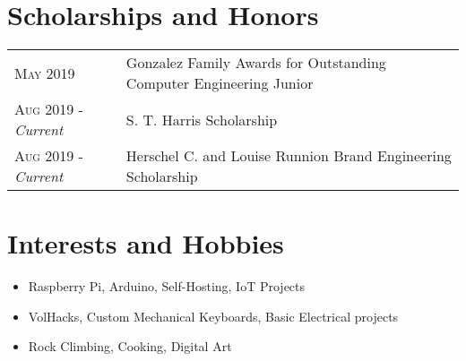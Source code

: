 \documentclass[a4paper,11pt]{article}
\begin{document}
\section{Scholarships and Honors}
\begin{tabularx}{\textwidth}{lX}
   \textsc{May 2019} & Gonzalez Family Awards for Outstanding Computer Engineering Junior\\
   \textsc{Aug 2019} \-- \emph{Current} & S. T. Harris Scholarship\\
   \textsc{Aug 2019} \-- \emph{Current} & Herschel C. and Louise Runnion Brand Engineering Scholarship\\
\end{tabularx}

\section{Interests and Hobbies}
\begin{itemize}[topsep=1pt,itemsep=0pt,partopsep=1pt, parsep=1pt]
   \item Raspberry Pi, Arduino, Self-Hosting, IoT Projects
   \item VolHacks, Custom Mechanical Keyboards, Basic Electrical projects
   \item Rock Climbing, Cooking, Digital Art
\end{itemize}
\end{document}

